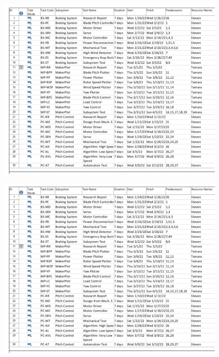 \documentclass[11pt,letterpaper,conference]{IEEEtran}
\begin{document}
\begin{figure}[th]
    \centering
    \includegraphics[width=\textwidth]{ext/tasks.pdf}
\end{figure}
\begin{figure}[th]
    \centering
    \includegraphics[width=\textwidth, page=2]{ext/tasks.pdf}
\end{figure}
\end{document}
